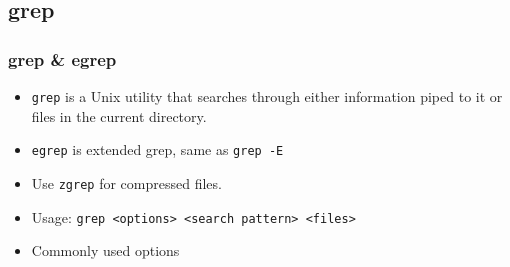 \documentclass[slidestop,mathserif,compress,xcolor=svgnames]{beamer}
\begin{document}
\subsection{grep}
\begin{frame}
  \frametitle{\small grep \& egrep}
  \begin{itemize}
    \item \texttt{grep} is a Unix utility that searches through either information piped to it or files in the current directory.
    \item \texttt{egrep} is extended grep, same as \texttt{grep -E}
    \item Use \texttt{zgrep} for compressed files.
    \item Usage: \texttt{grep <options> <search pattern> <files>} 
    \item Commonly used options
  \end{itemize}
\end{frame}
\end{document}
